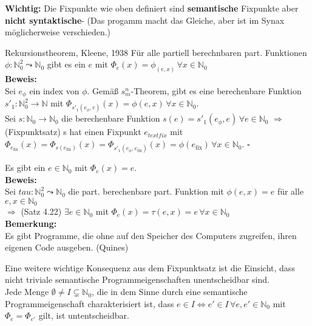 \textbf{Wichtig:} Die Fixpunkte wie oben definiert sind \textbf{semantische} Fixpunkte aber \textbf{nicht syntaktische}-
(Das progamm macht das Gleiche, aber ist im Synax möglicherweise verschieden.)

\begin{satz}{Rekursionstheorem, Kleene, 1938}
    Für alle partiell berechnbaren part. Funktionen $\phi: \mathbb{N}_0^2 \leadsto \mathbb{N}_0$ gibt es ein $e$ mit 
    $\Phi_e(x) = \phi_{(e,x)} \, \forall x \in \mathbb{N}_0$ \\

    \textbf{Beweis:} \\
    Sei $e_\phi$ ein index von $\phi$. Gemäß $s^n_m$-Theorem, gibt es eine berechenbare Funktion $s'_1 : \mathbb{N}_0^2 \rightarrow \mathbb{N}$ 
    mit $\Phi_{s'_1(e_\phi,e)}(x) = \phi(e,x) \, \forall x \in \mathbb{N}_0$. \\

    Sei $s: \mathbb{N}_0 \rightarrow \mathbb{N}_0$ die berechenbare Funktion $s(e)= s'_1(e_\phi,e) \, \forall e \in \mathbb{N}_0$
    $\Rightarrow$ (Fixpunktsatz) s hat einen Fixpunkt $e_{text{fix}}$ mit \\
    $\Phi_{e_{\text{fix}}}(x) = \Phi_{s(e_{\text{fix}})}(x) = \Phi_{s'_1(e_\phi,e_{\text{fix}})}(x) = \phi(e_{\text{fix}}) \, \forall x \in \mathbb{N}_0$. $\square$
\end{satz}

\begin{kollar}{}
    Es gibt ein $e \in \mathbb{N}_0$ mit $\Phi_e(x) =e$. \\

    \textbf{Beweis:}\\
    Sei $tau : \mathbb{N}_0^2 \leadsto \mathbb{N}_0$ die part. berechenbare part. Funktion mit $\phi(e,x) = e$ für alle $e,x \in \mathbb{N}_0$ \\
    $\Rightarrow$ (Satz 4.22) $\exists e \in \mathbb{N}_0$ mit $\Phi_e(x) = \tau(e,x)=e \, \forall x \in \mathbb{N}_0$ \\

    \textbf{Bemerkung:} \\
    Es gibt Programme, die ohne auf den Speicher des Computers zugreifen, ihren eigenen Code ausgeben. (Quines)
\end{kollar}

Eine weitere wichtige Konsequenz aus dem Fixpunktsatz ist die Einsicht, dass nicht triviale semantische Programmeigenschaften unentscheidbar sind. \\
Jede Menge $\emptyset \neq I \subsetneq \mathbb{N}_0$, die in dem Sinne durch eine semantische Programmeigenschaft charakterisiert ist, dass
$e \in I \Leftrightarrow e' \in I \, \forall e,e' \in \mathbb{N}_0$ mit $\Phi_e = \Phi_{e'}$ gilt, ist untentscheidbar. \\


